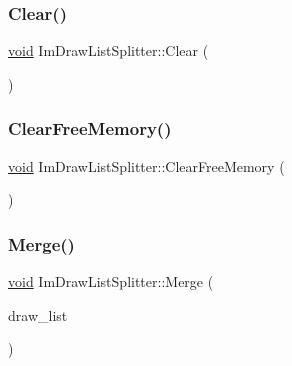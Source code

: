 \subsubsection{\texorpdfstring{Clear()}{Clear()}}
{\footnotesize\ttfamily \hyperlink{imgui__impl__opengl3__loader_8h_ac668e7cffd9e2e9cfee428b9b2f34fa7}{void} Im\+Draw\+List\+Splitter\+::\+Clear (\begin{DoxyParamCaption}{ }\end{DoxyParamCaption})\hspace{0.3cm}{\ttfamily [inline]}}

\mbox{\label{structImDrawListSplitter_a95dbdaa7ea2a0328a85732ed210a549b}} 
\subsubsection{\texorpdfstring{Clear\+Free\+Memory()}{ClearFreeMemory()}}
{\footnotesize\ttfamily \hyperlink{imgui__impl__opengl3__loader_8h_ac668e7cffd9e2e9cfee428b9b2f34fa7}{void} Im\+Draw\+List\+Splitter\+::\+Clear\+Free\+Memory (\begin{DoxyParamCaption}{ }\end{DoxyParamCaption})}

\mbox{\label{structImDrawListSplitter_af3fc4bad2abca9e481d476d1877ba5be}} 
\subsubsection{\texorpdfstring{Merge()}{Merge()}}
{\footnotesize\ttfamily \hyperlink{imgui__impl__opengl3__loader_8h_ac668e7cffd9e2e9cfee428b9b2f34fa7}{void} Im\+Draw\+List\+Splitter\+::\+Merge (\begin{DoxyParamCaption}\item[{\hyperlink{structImDrawList}{Im\+Draw\+List} $\ast$}]{draw\+\_\+list }\end{DoxyParamCaption})}

\mbox{\label{structImDrawListSplitter_ad3797b0755caa07f3d69a9e3566eb0e5}} 
